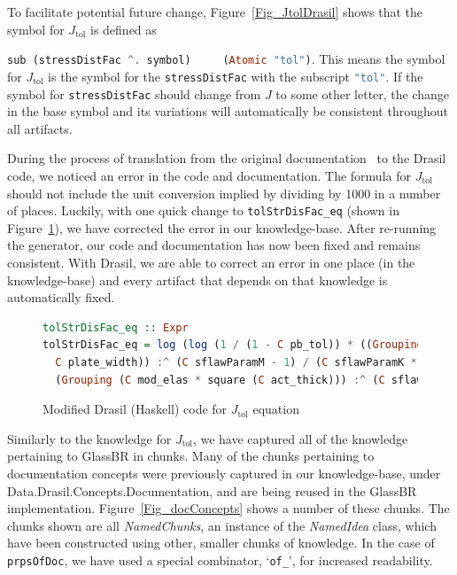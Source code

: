 \documentclass[sigconf]{acmart}
\newcommand{\jtol}{$J_{\mbox{tol}}$}
\newcommand{\inlHask}[1]{\lstinline[language=Haskell, columns=fullflexible,
  basicstyle=\ttfamily, showstringspaces=false, breaklines=true]{#1}}
\begin{document}
To facilitate potential future change, Figure~\ref{Fig_JtolDrasil} shows that
the symbol for \jtol{} is defined as {\inlHask{sub (stressDistFac ^. symbol)
    (Atomic "tol")}.  This means the symbol for \jtol{} is the symbol for the
  {\inlHask{stressDistFac}} with the subscript {\inlHask{"tol"}}.  If the symbol
  for {\inlHask{stressDistFac}} should change from $J$ to some other letter, the
  change in the base symbol and its variations will automatically be consistent
  throughout all artifacts.

During the process of translation from the original
documentation~\cite{SmithJegatheesanAndKelly2016} to the Drasil code, we noticed
an error in the code and documentation. The formula for \jtol{} should not
include the unit conversion implied by dividing by 1000 in a number of
places. Luckily, with one quick change to {\inlHask{tolStrDisFac_eq}} (shown in
Figure~\ref{Fig_JtolDrasil_fix}), we have corrected the error in our
knowledge-base. After re-running the generator, our code and documentation has
now been fixed and remains consistent.  With Drasil, we are able to correct an
error in one place (in the knowledge-base) and every artifact that depends on
that knowledge is automatically fixed.

\begin{figure}
\begin{lstlisting}[language=Haskell, frame=single, showstringspaces=false, basicstyle=\small]
tolStrDisFac_eq :: Expr
tolStrDisFac_eq = log (log (1 / (1 - C pb_tol)) * ((Grouping (C plate_len * 
  C plate_width)) :^ (C sflawParamM - 1) / (C sflawParamK * 
  (Grouping (C mod_elas * square (C act_thick))) :^ (C sflawParamM) * (C loadDF))))
\end{lstlisting}
\caption{Modified Drasil (Haskell) code for \jtol{} equation}
\label{Fig_JtolDrasil_fix}
\end{figure}

Similarly to the knowledge for \jtol{}, we have captured all of the knowledge
pertaining to GlassBR in chunks. Many of the chunks pertaining to documentation concepts were previously captured in our knowledge-base, under Data.Drasil.Concepts.Documentation, and are being reused in the GlassBR implementation. Figure~\ref{Fig_docConcepts} shows a number of these chunks. The chunks shown are all \textit{NamedChunks}, an instance of the \textit{NamedIdea} class, which have been constructed using other, smaller chunks of knowledge. In the case of \inlHask{prpsOfDoc}, we have used a special combinator, `\inlHask{of_}', for increased readability.

}
\end{document}
